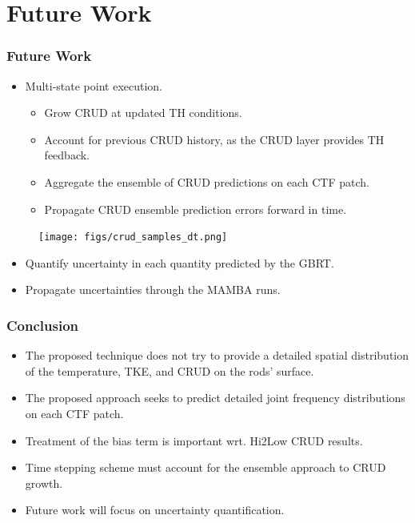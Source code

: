 \documentclass[t, pdftex]{beamer}
\begin{document}
\section{Future Work}
\begin{frame}\frametitle{Future Work}
\begin{itemize}
\item Multi-state point execution.
\begin{itemize}
	\item Grow CRUD at updated TH conditions.
	\item Account for previous CRUD history, as the CRUD layer provides TH feedback.
	\item Aggregate the ensemble of CRUD predictions on each CTF patch.
	\item Propagate CRUD ensemble prediction errors forward in time.
\end{itemize}
\end{itemize}
\begin{figure}[!htbp]
\centering
\texttt{[image: figs/crud\_samples\_dt.png]}
\label{model_overview}
\end{figure}
\begin{itemize}
\item Quantify uncertainty in each quantity predicted by the GBRT.
\item Propagate uncertainties through the MAMBA runs.
\end{itemize}
\end{frame}

\begin{frame}
\frametitle{Conclusion}
\begin{itemize}
\item The proposed technique does not try to provide a detailed spatial distribution
of the temperature, TKE, and CRUD on the rods' surface.
\item The proposed approach seeks to predict detailed joint frequency distributions on each CTF patch.
\item Treatment of the bias term is important wrt. Hi2Low CRUD results.
\item Time stepping scheme must account for the ensemble approach to CRUD growth.
\item Future work will focus on uncertainty quantification.
\end{itemize}
\end{frame}
\end{document}
